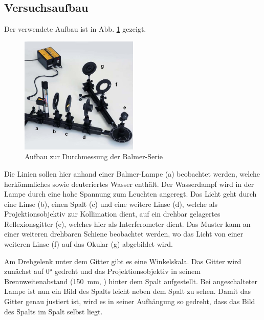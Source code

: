 \documentclass{article}
\begin{document}
\subsection{Versuchsaufbau}
Der verwendete Aufbau ist in Abb. \ref{fig:balmer-aufbau} gezeigt.
\begin{figure}[h]
  \centering
  \includegraphics[width=0.5\textwidth]{balmer-aufbau}
  \caption{Aufbau zur Durchmessung der Balmer-Serie \cite{Anleitung}}
  \label{fig:balmer-aufbau}
\end{figure}
Die Linien sollen hier anhand einer Balmer-Lampe (a) beobachtet werden, welche herkömmliches sowie deuteriertes Wasser enthält.
Der Wasserdampf wird in der Lampe durch eine hohe Spannung zum Leuchten angeregt. Das Licht geht durch eine Linse (b), einen Spalt (c) 
und eine weitere Linse (d), welche als Projektionsobjektiv zur Kollimation dient, auf ein drehbar gelagertes Reflexionsgitter (e), welches hier als Interferometer dient. Das Muster kann an einer weiteren
drehbaren Schiene beobachtet werden, wo das Licht von einer weiteren Linse (f) auf das Okular (g) abgebildet wird.

Am Drehgelenk unter dem Gitter gibt es eine Winkelskala. Das Gitter wird zunächst auf \ang{0} gedreht und das Projektionsobjektiv in seinem Brennweitenabstand
(\SI{150}{\mm}, \cite{Anleitung}) hinter dem Spalt aufgestellt. Bei angeschalteter Lampe ist nun ein Bild des Spalts leicht neben dem Spalt zu sehen.
Damit das Gitter genau justiert ist, wird es in seiner Aufhängung so gedreht, dass das Bild des Spalts im Spalt selbst liegt.
\end{document}
